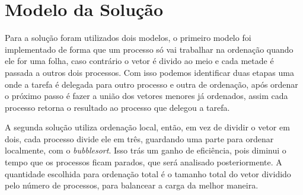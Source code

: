 \section{Modelo da Solução}

Para a solução foram utilizados dois modelos, o primeiro modelo foi implementado de forma que um processo só vai trabalhar na ordenação quando ele for uma folha, caso contrário o vetor é divido ao meio e cada metade é passada a outros dois processos. Com isso podemos identificar duas etapas uma onde a tarefa é delegada para outro processo e outra de ordenação, após ordenar o próximo passo é fazer a união dos vetores menores já ordenados, assim cada processo retorna o resultado ao processo que delegou a tarefa.

A segunda solução utiliza ordenação local, então, em vez de dividir o vetor em dois, cada processo divide ele em três, guardando uma parte para ordenar localmente, com o \emph{bubblesort}. Isso trás um ganho de eficiência, pois diminui o tempo que os processos ficam parados, que será analisado posteriormente. A quantidade escolhida para ordenação total é o tamanho total do vetor dividido pelo número de processos, para balancear a carga da melhor maneira.